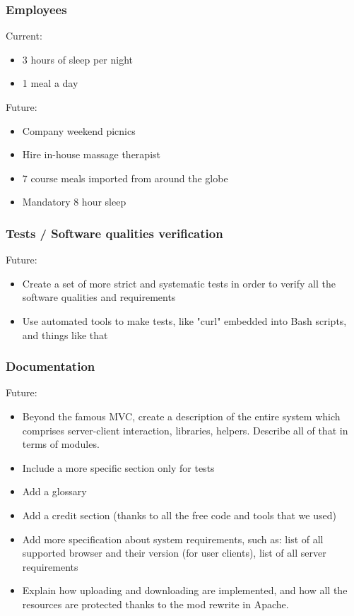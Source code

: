 \documentclass[10pt]{report}
\begin{document}
\subsubsection{Employees}
Current:
\begin{itemize}
\item 3 hours of sleep per night
\item 1 meal a day
\end{itemize}
Future:
\begin{itemize}
\item Company weekend picnics
\item Hire in-house massage therapist
\item 7 course meals imported from around the globe
\item Mandatory 8 hour sleep
\end{itemize}

\subsubsection{Tests / Software qualities verification}
Future:
\begin{itemize}
\item Create a set of more strict and systematic tests in order to verify all the software qualities and requirements
\item Use automated tools to make tests, like "curl" embedded into Bash scripts, and things like that
\end{itemize}

\subsubsection{Documentation}
Future:
\begin{itemize}
\item Beyond the famous MVC, create a description of the entire system which comprises server-client interaction, libraries, helpers. Describe all of that in terms of modules.
\item Include a more specific section only for tests
\item Add a glossary
\item Add a credit section (thanks to all the free code and tools that we used)
\item Add more specification about system requirements, such as: list of all supported browser and their version (for user clients), list of all server requirements
\item Explain how uploading and downloading are implemented, and how all the resources are protected thanks to the mod rewrite in Apache. 
\end{itemize}
\end{document}
